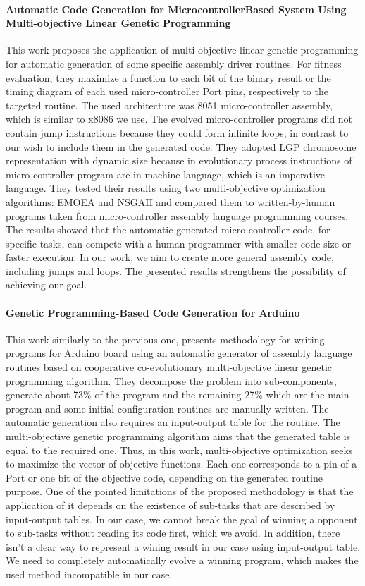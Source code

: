 \documentclass[dvipsnames,format=sigconf,anonymous=true,review=true]{acmart}
\begin{document}
\paragraph{Automatic Code Generation for MicrocontrollerBased System Using Multi-objective Linear Genetic
Programming}
This work \cite{Serruto2017Automatic} proposes the application of
multi-objective linear genetic programming for automatic
generation of some specific assembly driver routines. For fitness evaluation, they maximize a function to each bit of the binary result or the timing diagram of each used micro-controller Port pins, respectively to the targeted routine. The used architecture was 8051 micro-controller assembly, which is similar to x8086 we use. The evolved micro-controller programs did not contain jump instructions because they could form infinite loops, in contrast to our wish to include them in the generated code. They adopted LGP chromosome representation with dynamic size because in evolutionary process instructions of micro-controller program are in machine language, which is an imperative language. They tested their results using two multi-objective optimization algorithms: EMOEA and NSGAII and compared them to written-by-human programs taken from micro-controller assembly language programming courses. The results showed that the automatic generated micro-controller code, for specific tasks, can compete with a human programmer with smaller code size or faster execution. 
In our work, we aim to create more general assembly code, including jumps and loops. The presented results strengthens the possibility of achieving our goal. 

\paragraph{Genetic Programming-Based Code Generation for
Arduino}
This work \cite{Ferrel2020Genetic} similarly to the previous one, presents methodology for writing programs for Arduino board using an automatic generator of assembly language routines based on cooperative co-evolutionary multi-objective linear genetic programming algorithm. They decompose the problem into sub-components, generate about 73\% of the program and the remaining 27\% which are the main program and some initial configuration routines are manually written. The automatic generation also requires an input-output table for the routine. The multi-objective genetic programming algorithm aims that the generated table is equal to the required one. Thus, in this work, multi-objective optimization seeks to maximize the
vector of objective functions. Each one corresponds to a pin of a Port or one bit of the objective code, depending on the generated routine purpose. One of the pointed limitations of the proposed methodology is that the application of it depends on the existence of
sub-tasks that are described by input-output tables.
In our case, we cannot break the goal of winning a opponent to sub-tasks without reading its code first, which we avoid. In addition, there isn't a clear way to represent a wining result in our case using input-output table. We need to completely automatically evolve a winning program, which makes the used method incompatible in our case.
\end{document}
